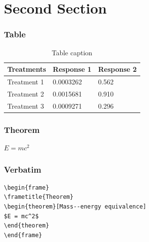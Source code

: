 \documentclass{beamer}
\begin{document}
\iffalse

\section{Second Section}

\begin{frame}
\frametitle{Table}
\begin{table}
\begin{tabular}{l l l}
\toprule
\textbf{Treatments} & \textbf{Response 1} & \textbf{Response 2}\\
\midrule
Treatment 1 & 0.0003262 & 0.562 \\
Treatment 2 & 0.0015681 & 0.910 \\
Treatment 3 & 0.0009271 & 0.296 \\
\bottomrule
\end{tabular}
\caption{Table caption}
\end{table}
\end{frame}


\begin{frame}
\frametitle{Theorem}
\begin{theorem}
$E = mc^2$
\end{theorem}
\end{frame}


\begin{frame}[fragile] %
\frametitle{Verbatim}
\begin{example}
\begin{verbatim}
\begin{frame}
\frametitle{Theorem}
\begin{theorem}[Mass--energy equivalence]
$E = mc^2$
\end{theorem}
\end{frame}\end{verbatim}
\end{example}
\end{frame}

\end{document}
